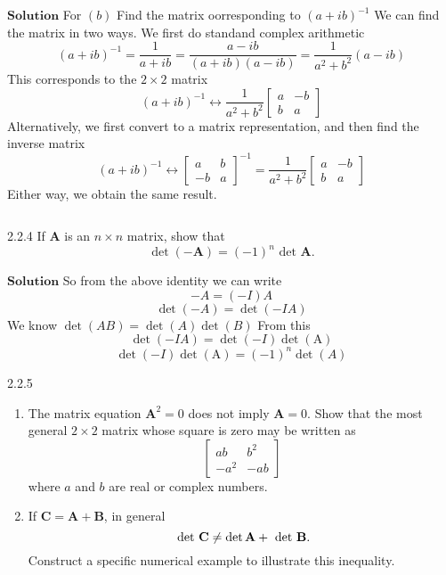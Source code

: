 $$$$

$\boxed{\textbf{Solution}}$  For $(b)$ Find the matrix oorresponding to $(a+i b)^{-1}$ We can find the matrix in two ways. We first do standand complex arithmetic
$$
(a+i b)^{-1}=\frac{1}{a+i b}=\frac{a-i b}{(a+i b)(a-i b)}=\frac{1}{a^{2}+b^{2}}(a-i b)
$$
This corresponds to the $2 \times 2$ matrix
$$
(a+i b)^{-1} \longleftrightarrow \frac{1}{a^{2}+b^{2}}\begin{bmatrix}{a} & {-b} \\ {b} & {a}\end{bmatrix}
$$
Alternatively, we first convert to a matrix representation, and then find the inverse
matrix
$$
(a+i b)^{-1} \leftrightarrow\begin{bmatrix}{a} & {b} \\ {-b} & {a}\end{bmatrix}^{-1}=\frac{1}{a^{2}+b^{2}}\begin{bmatrix}{a} & {-b} \\ {b} & {a}\end{bmatrix}
$$
Either way, we obtain the same result.

$$$$

\begin{mybox}{2.2.4}
If $\mathbf{A}$ is an $n \times n$ matrix, show that
$$
\operatorname{det}(-\mathbf{A})=(-1)^{n} \text { det } \mathbf{A}.
$$
\end{mybox}




$\boxed{\textbf{Solution}}$ 
So from the above identity we can write
$$-A=(-I) A$$
$$\operatorname{det}(-A)=\operatorname{det}(-I A)$$
We know $\operatorname{det}(A B)=\operatorname{det}(A) \operatorname{det}(B)$
From this
$$\operatorname{det}(-I A)=\operatorname{det}(-I) \operatorname{det}(\mathrm{A})$$
$$\operatorname{det}(-I) \operatorname{det}(\mathrm{A})=(-1)^{n} \operatorname{det}(A)$$


\newpage

\begin{mybox}{2.2.5}
\begin{enumerate}[$(a)$]
\item The matrix equation $\mathbf{A}^{2}=0$ does not imply $\mathbf{A}=0 .$ Show that the most general
$2 \times 2$ matrix whose square is zero may be written as
$$
\begin{bmatrix}{a b} & {b^{2}} \\ {-a^{2}} & {-a b}\end{bmatrix}
$$
where $a$ and $b$ are real or complex numbers.
\item If $\mathbf{C}=\mathbf{A}+\mathbf{B}$, in general
$$
\text { det } \mathbf{C}\neq \operatorname{det} \mathbf{A}+\text { det } \mathbf{B} \text.
$$
Construct a specific numerical example to illustrate this inequality.
\end{enumerate}
\end{mybox}


